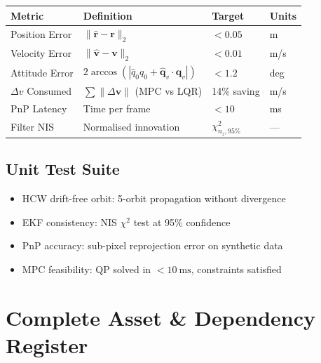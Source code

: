 \documentclass[12pt, a4paper]{article}
\newcommand{\vr}{\mathbf{r}}
\newcommand{\vv}{\mathbf{v}}
\newcommand{\Deltav}{\Delta v}
\begin{document}
\begin{center}
\begin{tabular}{llll}
\toprule
\textbf{Metric} & \textbf{Definition} & \textbf{Target} & \textbf{Units} \\
\midrule
Position Error & $\|\hat{\vr} - \vr\|_2$ & $< 0.05$ & m \\
Velocity Error & $\|\hat{\vv} - \vv\|_2$ & $< 0.01$ & m/s \\
Attitude Error & $2\arccos(|\hat{q}_0 q_0 + \hat{\mathbf{q}}_v \cdot \mathbf{q}_v|)$ & $< 1.2$ & deg \\
$\Deltav$ Consumed & $\sum\|\Delta\mathbf{v}\|$ (MPC vs LQR) & 14\% saving & m/s \\
PnP Latency & Time per frame & $< 10$ & ms \\
Filter NIS & Normalised innovation & $\chi^2_{n_z,95\%}$ & --- \\
\bottomrule
\end{tabular}
\end{center}

\subsection{Unit Test Suite}
\begin{itemize}[leftmargin=2em, itemsep=2pt]
    \item HCW drift-free orbit: 5-orbit propagation without divergence
    \item EKF consistency: NIS $\chi^2$ test at 95\% confidence
    \item PnP accuracy: sub-pixel reprojection error on synthetic data
    \item MPC feasibility: QP solved in $< 10\ \mathrm{ms}$, constraints satisfied
\end{itemize}

\section{Complete Asset \& Dependency Register}
\end{document}
